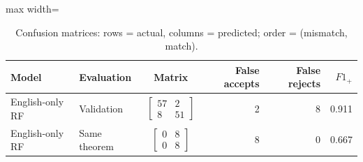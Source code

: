 \begin{table}[htbp]
\centering
\caption{Confusion matrices: rows = actual, columns = predicted; order = (mismatch, match).}
\label{tab:english-control-confusion}
\small
\begin{adjustbox}{max width=\textwidth}
\begin{tabular}{llcrrr}
\toprule
Model & Evaluation & Matrix & False accepts & False rejects & $F1_+$ \\
\midrule
English-only RF & Validation & $\left[\begin{array}{rr}57&2\\8&51\end{array}\right]$ & 2 & 8 & 0.911 \\
English-only RF & Same theorem & $\left[\begin{array}{rr}0&8\\0&8\end{array}\right]$ & 8 & 0 & 0.667 \\
\bottomrule
\end{tabular}
\end{adjustbox}
\end{table}
